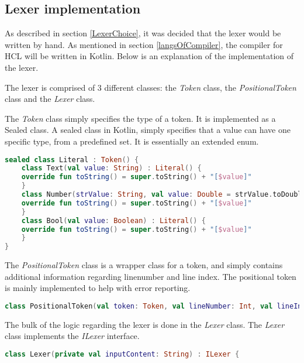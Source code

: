 \subsection{Lexer implementation}
As described in section \ref{LexerChoice}, it was decided that the lexer would be written by hand.
As mentioned in section \ref{langsOfCompiler}, the compiler for HCL will be written in Kotlin.
Below is an explanation of the implementation of the lexer.

The lexer is comprised of 3 different classes: the \textit{Token} class, the \textit{PositionalToken} class and the \textit{Lexer} class.

The \textit{Token} class simply specifies the type of a token. 
It is implemented as a Sealed class. 
A sealed class in Kotlin, simply specifies that a value can have one specific type, from a predefined set\cite{KotlinSealed}.
It is essentially an extended enum.
\begin{lstlisting}[language=Kotlin,label=lis:tokenClass,caption=A snippet from the token class .,firstnumber=9]
sealed class Literal : Token() {
	class Text(val value: String) : Literal() {
	override fun toString() = super.toString() + "[$value]"
	}
	class Number(strValue: String, val value: Double = strValue.toDouble()) : Literal() {
	override fun toString() = super.toString() + "[$value]"
	}
	class Bool(val value: Boolean) : Literal() {
	override fun toString() = super.toString() + "[$value]"
	}
}
\end{lstlisting}

The \textit{PositionalToken} class is a wrapper class for a token, and simply contains additional information regarding linenumber and line index.
The positional token is mainly implemented to help with error reporting.
\begin{lstlisting}[language=Kotlin,label=lis:PositionalTokenClass,caption=A snippet from the token class .,firstnumber=10]
class PositionalToken(val token: Token, val lineNumber: Int, val lineIndex: Int)
\end{lstlisting}

The bulk of the logic regarding the lexer is done in the \textit{Lexer} class.
The \textit{Lexer} class implements the \textit{ILexer} interface.

\begin{lstlisting}[language=Kotlin,label=lis:Lexer,caption=The Lexer .,firstnumber=8]
class Lexer(private val inputContent: String) : ILexer {
\end{lstlisting}

